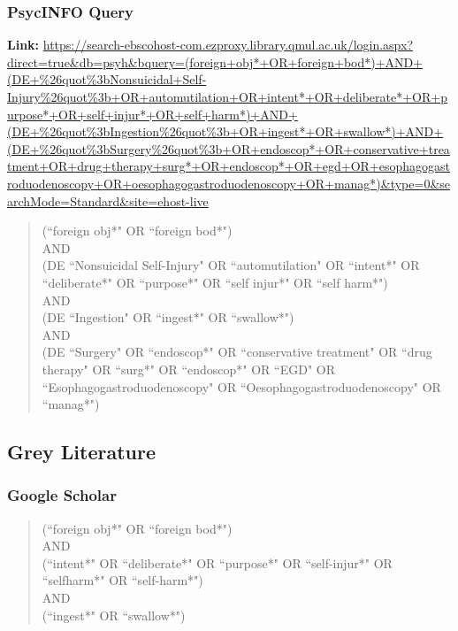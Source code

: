 \begin{appendices}
\clearpage

\subsubsection{PsycINFO Query}
\textbf{Link:} \url{https://search-ebscohost-com.ezproxy.library.qmul.ac.uk/login.aspx?direct=true&db=psyh&bquery=(foreign+obj*+OR+foreign+bod*)+AND+(DE+%26quot%3bNonsuicidal+Self-Injury%26quot%3b+OR+automutilation+OR+intent*+OR+deliberate*+OR+purpose*+OR+self+injur*+OR+self+harm*)+AND+(DE+%26quot%3bIngestion%26quot%3b+OR+ingest*+OR+swallow*)+AND+(DE+%26quot%3bSurgery%26quot%3b+OR+endoscop*+OR+conservative+treatment+OR+drug+therapy+surg*+OR+endoscop*+OR+egd+OR+esophagogastroduodenoscopy+OR+oesophagogastroduodenoscopy+OR+manag*)&type=0&searchMode=Standard&site=ehost-live}
\begin{quote}
(``foreign obj*" OR ``foreign bod*")\\
AND\\
(DE ``Nonsuicidal Self-Injury" OR ``automutilation" OR ``intent*" OR ``deliberate*" OR ``purpose*" OR ``self injur*" OR ``self harm*")\\
AND\\
(DE ``Ingestion" OR ``ingest*" OR ``swallow*")\\
AND\\
(DE ``Surgery" OR ``endoscop*" OR ``conservative treatment" OR ``drug therapy" OR ``surg*" OR ``endoscop*" OR ``EGD" OR ``Esophagogastroduodenoscopy" OR ``Oesophagogastroduodenoscopy" OR ``manag*")
\end{quote}

\subsection{Grey Literature}

\subsubsection*{Google Scholar}
\begin{quote}
(``foreign obj*" OR ``foreign bod*")\\
AND\\
(``intent*" OR ``deliberate*" OR ``purpose*" OR ``self-injur*" OR ``selfharm*" OR ``self-harm*")\\
AND\\
(``ingest*" OR ``swallow*")
\end{quote}

\newpage


\end{appendices}
